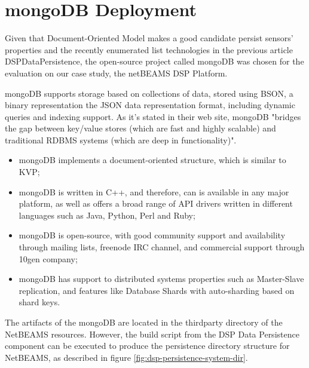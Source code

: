 \section{mongoDB Deployment}
\label{sec:mongodb-deployment}

Given that Document-Oriented Model makes a good candidate persist sensors'
properties and the recently enumerated list technologies in the previous
article DSPDataPersistence, the open-source project called mongoDB was chosen
for the evaluation on our case study, the netBEAMS DSP Platform.

mongoDB supports storage based on collections of data, stored using BSON, a
binary representation the JSON data representation format, including dynamic
queries and indexing support. As it's stated in their web site, mongoDB
"bridges the gap between key/value stores (which are fast and highly scalable)
and traditional RDBMS systems (which are deep in functionality)".

\begin{itemize}
  \item mongoDB implements a document-oriented structure, which is similar to
  KVP;
  \item mongoDB is written in C++, and therefore, can is available in any major
  platform, as well as offers a broad range of API drivers written in different
  languages such as Java, Python, Perl and Ruby; 
  \item mongoDB is open-source, with good community support and availability
  through mailing lists, freenode IRC channel, and commercial support through
  10gen company; 
  \item mongoDB has support to distributed systems properties such as
  Master-Slave replication, and features like Database Shards with
  auto-sharding based on shard keys.
\end{itemize}

The artifacts of the mongoDB are located in the thirdparty directory of the
NetBEAMS resources. However, the build script from the DSP Data Persistence
component can be executed to produce the persistence directory
structure for NetBEAMS, as described in figure
\ref{fig:dsp-persistence-system-dir}.

